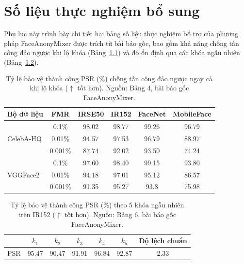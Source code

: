 \chapter{Số liệu thực nghiệm bổ sung}
\label{app:extra_tables}

Phụ lục này trình bày chi tiết hai bảng số liệu thực nghiệm bổ trợ của phương pháp FaceAnonyMixer được trích từ bài báo gốc, bao gồm khả năng chống tấn công đảo ngược khi lộ khóa (Bảng~\ref{tab:noninvertibility}) và độ ổn định qua các khóa ngẫu nhiên (Bảng~\ref{tab:key_robustness}).

\begin{table}[H]
\centering
\small
\setlength{\tabcolsep}{6pt}
\caption{Tỷ lệ bảo vệ thành công PSR (\%) chống tấn công đảo ngược ngay cả khi lộ khóa ($\uparrow$ tốt hơn). Nguồn: Bảng 4, bài báo gốc FaceAnonyMixer.}
\label{tab:noninvertibility}
\begin{tabular}{|l|c|cccc|}
\hline
\textbf{Bộ dữ liệu} & \textbf{FMR} & IRSE50 & IR152 & FaceNet & MobileFace \\
\hline
\multirow{3}{*}{CelebA-HQ} & 0.1\% & 98.02 & 98.77 & 99.26 & 96.79 \\
 & 0.01\% & 94.57 & 97.53 & 96.79 & 88.97 \\
 & 0.001\% & 87.74 & 92.02 & 93.50 & 74.24 \\
\hline
\multirow{3}{*}{VGGFace2} & 0.1\% & 97.60 & 98.40 & 99.15 & 93.80 \\
 & 0.01\% & 94.18 & 97.01 & 95.12 & 86.57 \\
 & 0.001\% & 91.35 & 95.27 & 93.8 & 75.98 \\
\hline
\end{tabular}
\end{table}

\begin{table}[H]
\centering
\small
\setlength{\tabcolsep}{6pt}
\caption{Tỷ lệ bảo vệ thành công PSR (\%) theo 5 khóa ngẫu nhiên trên IR152 ($\uparrow$ tốt hơn). Nguồn: Bảng 6, bài báo gốc FaceAnonyMixer.}
\label{tab:key_robustness}
\begin{tabular}{|c|ccccc|c|}
\hline
 & $k_1$ & $k_2$ & $k_3$ & $k_4$ & $k_5$ & \textbf{Độ lệch chuẩn} \\
\hline
PSR & 95.47 & 90.47 & 91.91 & 96.84 & 92.87 & 2.33 \\
\hline
\end{tabular}
\end{table}
